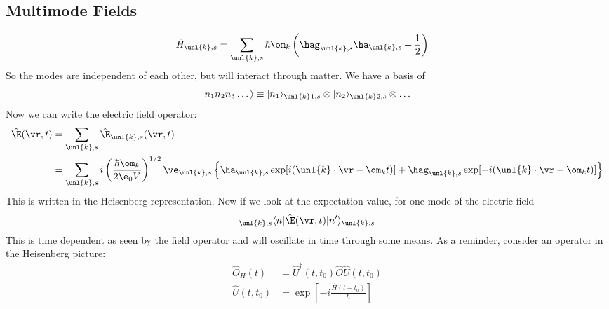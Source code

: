 \documentclass[a4paper, 11pt, normalem]{report}
\begin{document}
\section{Multimode Fields}
\begin{align}
    \hat{H}_{\unl{k},s} &= \sum_{\unl{k},s} \hbar\om_k \left(\hag_{\unl{k},s}\ha_{\unl{k},s} + \frac12\right)
\end{align}
So the modes are independent of each other, but will interact through matter. 
We have a basis of 
\begin{equation}
    |n_1n_2n_3\dots\rangle \equiv |n_1\rangle_{\unl{k}1,s}\otimes|n_2\rangle_{\unl{k}2,s}\otimes\dots
\end{equation}
Now we can write the electric field operator:
\begin{align}
    \hat{\E}(\vr,t) &= \sum_{\unl{k},s} \hat{\E}_{\unl{k},s}(\vr,t) \\
                    &= \sum_{\unl{k},s} i\left(\frac{\hbar\om_k}{2\e_0V}\right)^{1/2}\ve_{\unl{k},s}\left\{\ha_{\unl{k},s}\exp[i(\unl{k}\cdot\vr-\om_kt)] + \hag_{\unl{k},s}\exp[-i(\unl{k}\cdot\vr-\om_kt)]\right\}
\end{align}
This is written in the Heisenberg representation. 
Now if we look at the expectation value, for one mode of the electric field
\begin{align}
    {}_{\unl{k},s}\langle n|\hat{\E}(\vr,t)|n'\rangle_{\unl{k},s}
\end{align}
This is time dependent as seen by the field operator and will oscillate in time through some means. 
As a reminder, consider an operator in the Heisenberg picture:
\begin{align}
    \hat{O}_H(t) &= \hat{U}^\dagger(t,t_0)\hat{O}\hat{U}(t,t_0) \\ 
    \hat{U}(t,t_0) &= \exp\left[-i\frac{\hat{H}(t-t_0)}{\hbar}\right]
\end{align}

\chapter{}
\end{document}
